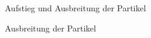 \documentclass[intern,palatino]{cgBA}
\begin{document}

\begin{figure}[H]
	\caption{Aufstieg und Ausbreitung der Partikel}
	\label{img:particle1}
\end{figure}

\begin{figure}[H]
	\caption{Ausbreitung der Partikel}
		\label{img:particle2}
\end{figure}
\end{document}
